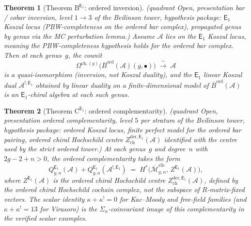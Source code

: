 \documentclass[11pt,reqno]{amsart}
\newtheorem{theorem}{Theorem}[section]
\theoremstyle{definition}
\theoremstyle{remark}
\newcommand{\cA}{\mathcal{A}}
\newcommand{\cM}{\mathcal{M}}
\newcommand{\Eone}{\mathsf{E}_{1}}
\newcommand{\Barord}{\overline{B}^{\mathrm{ord}}}
\numberwithin{equation}{section}
\begin{document}
\begin{theorem}[Theorem $\mathrm{B}^{\Eone}$: ordered inversion]
\label{thm:ordered-B}
\textup{(}\emph{quadrant} Open, \emph{presentation} bar / cobar
inversion, \emph{level} $1 \to 3$ of the Beilinson tower,
\emph{hypothesis package}: $\Eone$ Koszul locus
\textup{(}PBW-completeness on the ordered bar
complex\textup{)}, propagated genus by genus via the MC
perturbation lemma.\textup{)}
Assume $\cA$ lies on the $\Eone$ Koszul locus, meaning the
PBW-completeness hypothesis holds for the ordered bar complex. Then
at each genus~$g$, the counit
\[
  \Omega^{\mathrm{ch},(g)}\!\bigl(\Barord(\cA)(g,\bullet)\bigr)
  \;\xrightarrow{\;\sim\;}\; \cA
\]
is a quasi-isomorphism (inversion, not Koszul duality), and the
$\Eone$ linear Koszul dual $\cA^{!,\Eone}$ obtained by linear
duality on a finite-dimensional model of $\Barord(\cA)$ is an
$\Eone$-chiral algebra at each such genus.
\end{theorem}

\begin{theorem}[Theorem $\mathrm{C}^{\Eone}$: ordered
complementarity]
\label{thm:ordered-C}
\textup{(}\emph{quadrant} Open, \emph{presentation} ordered
complementarity, \emph{level} $5$ per stratum of the Beilinson
tower, \emph{hypothesis package}: ordered Koszul locus, finite
perfect model for the ordered bar pairing, ordered chiral
Hochschild centre $Z^{\mathrm{der}, \Eone}_{\mathrm{ch}}(\cA)$
identified with the centre used by the strict ordered
tower.\textup{)}
At each genus~$g$ and degree~$n$ with $2g-2+n>0$, the ordered
complementarity takes the form
\begin{equation}\label{eq:ordered-C}
  Q^{\Eone}_{g,n}(\cA) + Q^{\Eone}_{g,n}(\cA^{!,\Eone})
  \;=\;
  H^*\!\bigl(\overline{\cM}_{g,n}^{\mathrm{rib}},\,
  Z^{\Eone}(\cA)\bigr),
\end{equation}
where $Z^{\Eone}(\cA)$ is the ordered chiral Hochschild centre
$Z^{\mathrm{der}, \Eone}_{\mathrm{ch}}(\cA)$, defined by the
ordered chiral Hochschild cochain complex, not the subspace of
$R$-matrix-fixed vectors. The scalar identity
$\kappa + \kappa^! = 0$ for Kac--Moody and free-field families
(and $\kappa + \kappa^! = 13$ for Virasoro) is the
$\Sigma_n$-coinvariant image of this complementarity in the
verified scalar examples.
\end{theorem}
\end{document}
